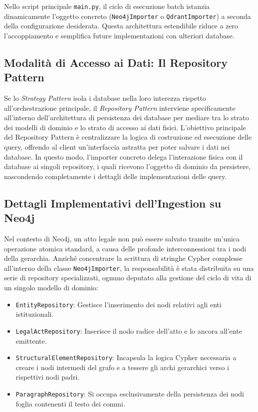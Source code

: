 Nello script principale \texttt{main.py}, il ciclo di esecuzione batch istanzia dinamicamente l'oggetto concreto (\texttt{Neo4jImporter} o \texttt{QdrantImporter}) a seconda della configurazione desiderata. Questa architettura estendibile riduce a zero l'accoppiamento e semplifica future implementazioni con ulteriori database.


\subsection{Modalità di Accesso ai Dati: Il Repository Pattern}
Se lo \textit{Strategy Pattern} isola i database nella loro interezza rispetto all'orchestrazione principale, il \textit{Repository Pattern} interviene specificamente all'interno dell'architettura di persistenza dei database per mediare tra lo strato dei modelli di dominio e lo strato di accesso ai dati fisici. 
L'obiettivo principale del Repository Pattern è centralizzare la logica di costruzione ed esecuzione delle query, offrendo al client un'interfaccia astratta per poter salvare i dati nei database.
In questo modo, l'importer concreto delega l'interazione fisica con il database ai singoli repository, i quali ricevono l'oggetto di dominio da persistere, nascondendo completamente i dettagli delle implementazioni delle query.

\subsection{Dettagli Implementativi dell'Ingestion su Neo4j}
Nel contesto di Neo4j, un atto legale non può essere salvato tramite un'unica operazione atomica standard, a causa delle profonde interconnessioni tra i nodi della gerarchia. Anziché concentrare la scrittura di stringhe Cypher complesse all'interno della classe \texttt{Neo4jImporter}, la responsabilità è stata distribuita su una serie di repository specializzati, ognuno deputato alla gestione del ciclo di vita di un singolo modello di dominio:
\begin{itemize}
    \item \texttt{EntityRepository}: Gestisce l'inserimento dei nodi relativi agli enti istituzionali.
    \item \texttt{LegalActRepository}: Inserisce il nodo radice dell'atto e lo ancora all'ente emittente.
    \item \texttt{StructuralElementRepository}: Incapsula la logica Cypher necessaria a creare i nodi intermedi del grafo e a tessere gli archi gerarchici verso i rispettivi nodi padri.
    \item \texttt{ParagraphRepository}: Si occupa esclusivamente della persistenza dei nodi foglia contenenti il testo dei commi.
\end{itemize}

